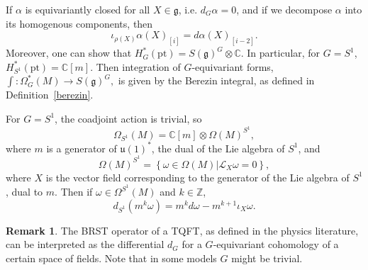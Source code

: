 \documentclass[a4paper,12pt,reqno,sumlimits]{amsart}
\theoremstyle{plain}
\theoremstyle{definition}
\newtheorem{rem}[thm]{Remark}
\newcommand{\C}{{\mathbb C}}
\newcommand{\Z}{{\mathbb Z}}
\newcommand{\1}{{\bf 1}}
\newcommand{\g}{{\mathfrak  g}}
\newcommand{\uu}{{\mathfrak  u}}
\newcommand{\calL}{{\mathcal L}}
\renewcommand{\to}{\longrightarrow}
\numberwithin{equation}{section}
\begin{document}
If $\alpha$ is equivariantly closed for all $X\in\g$, i.e.  $d_G\alpha=0$,
and if we decompose $\alpha$ into its homogenous components, then
$$
\iota_{\rho(X)}\alpha(X)_{[i]}=d\alpha(X)_{[i-2]}.
$$
Moreover, one can show that $H^*_G(\text{pt})=S(\g)^G\otimes\C$. In
particular, for $G=S^1$, $H^*_{S^1}(\text{pt})=\C[m].$ Then integration of
$G$-equivariant forms, $\displaystyle\int:\Omega^*_G(M)\to S(\g)^G, $ is
given by the Berezin integral, as defined in Definition~\ref{berezin}.

For $G=S^1$, the coadjoint action is trivial, so
$$
\Omega_{S^1}(M)=\C[m]\otimes\Omega(M)^{S^1},
$$
where $m$ is a generator of $\uu(1)^*$, the dual of the Lie algebra of
$S^1$, and
$$
\Omega(M)^{S^1}=\left\{\omega\in\Omega(M)|\calL_X\omega=0\right\},
$$
where
$X$ is the vector field corresponding to the generator of the Lie algebra
of $S^1$, dual to $m$.  Then if $\omega\in\Omega^{S^1}(M)$ and $k\in\Z$,
$$
d_{S^1}(m^k\omega)=m^k d\omega - m^{k+1}\iota_X\omega.
$$

\begin{rem}
  The BRST operator of a TQFT, as defined in the physics literature, can be
  interpreted as the differential $d_G$ for a $G$-equivariant cohomology of a
  certain space of fields. Note that in some models $G$ might be trivial.
\end{rem}
\end{document}
